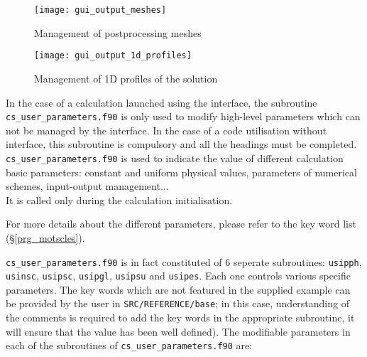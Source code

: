 {{\begin{figure}[!ht]
\begin{center}
\texttt{[image: gui\_output\_meshes]}
\caption{Management of postprocessing meshes}
\label{gui_output_meshes}
\end{center}
\end{figure}

\begin{figure}[!ht]
\begin{center}
\texttt{[image: gui\_output\_1d\_profiles]}
\caption{Management of 1D profiles of the solution}
\label{fig:26_GUI}
\end{center}
\end{figure}

In the case of a calculation launched using the interface, the subroutine \texttt{cs\_user\_parameters.f90} is only
used to modify high-level parameters which can not be managed by the
interface. In the case of a code utilisation without interface, this
subroutine is compulsory and all the headings must be completed. \texttt{cs\_user\_parameters.f90} is used to indicate the value of different calculation
basic parameters: constant and uniform physical values, parameters of
numerical schemes, input-output management...\\
It is called only during the calculation initialisation.

For more details about the different parameters, please refer to the key
word list (\S\ref{prg_motscles}).

\texttt{cs\_user\_parameters.f90} is in fact constituted of 6 seperate subroutines:  \texttt{usipph},
 \texttt{usinsc}, \texttt{usipsc}, \texttt{usipgl},
\texttt{usipsu} and \texttt{usipes}. Each one controls various
 specific parameters. The key words which are not featured in the supplied example
can be provided by the user in \texttt{SRC/REFERENCE/base}; in this case,
understanding of the comments is required to add the key words in the appropriate
subroutine, it will ensure that the value
has been well defined). The modifiable parameters in each of the subroutines of
\texttt{cs\_user\_parameters.f90} are:

}}
